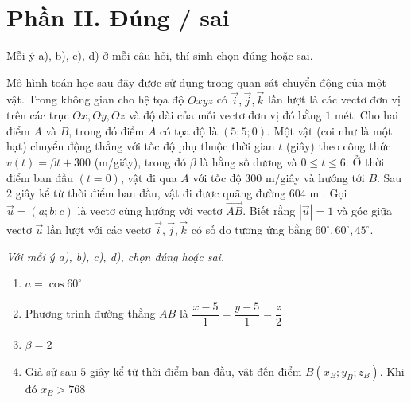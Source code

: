 \documentclass{exam}
\begin{document}
\section*{Phần II. Đúng / sai}
{\footnotesize Mỗi ý a), b), c), d) ở mỗi câu hỏi, thí sinh chọn đúng hoặc sai.}



\begin{question}
Mô hình toán học sau đây được sử dụng trong quan sát chuyển động của một vật. Trong không gian cho hệ tọa độ $Oxyz$ có $\vec{i}, \vec{j}, \vec{k}$ lần lượt là các vectơ đơn vị trên các trục $Ox, Oy, Oz$ và độ dài của mỗi vectơ đơn vị đó bằng $1$ mét. Cho hai điểm $A$ và $B$, trong đó điểm $A$ có tọa độ là $(5; 5; 0)$. Một vật (coi như là một hạt) chuyển động thẳng với tốc độ phụ thuộc thời gian $t$ (giây) theo công thức $v(t)=\beta t+300$ (m/giây), trong đó $\beta$ là hằng số dương và $0 \leq t \leq 6$. Ở thời điểm ban đầu $(t=0)$, vật đi qua $A$ với tốc độ $300$ m/giây và hướng tới $B$. Sau $2$ giây kể từ thời điểm ban đầu, vật đi được quãng đường 604 m . Gọi $\vec{u}=(a; b; c)$ là vectơ cùng hướng với vectơ $\overrightarrow{AB}$. Biết rằng $|\vec{u}|=1$ và góc giữa vectơ $\vec{u}$ lần lượt với các vectơ $\vec{i}, \vec{j}, \vec{k}$ có số đo tương ứng bằng $60^{\circ}, 60^{\circ}, 45^{\circ}$.

\par\vspace{0.15em}
{\small\textit{Với mỗi ý a), b), c), d), chọn đúng hoặc sai.}}
\par\vspace{0.1em}
\begin{enumerate}[label=\textbf{\alph*)}, leftmargin=1.6em, itemsep=0.2em, topsep=0.2em]

\item $a=\cos 60^{\circ}$

\item Phương trình đường thẳng $AB$ là $\dfrac{x-5}{1}=\dfrac{y-5}{1}=\dfrac{z}{2}$

\item $\beta=2$

\item Giả sử sau $5$ giây kể từ thời điểm ban đầu, vật đến điểm $B\left(x_B; y_B; z_B\right)$. Khi đó $x_B>768$

\end{enumerate}

\end{question}
\end{document}
